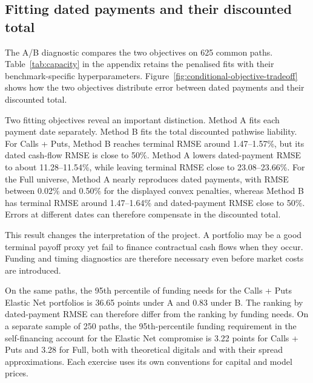 \subsection{Fitting dated payments and their discounted total}

The A/B diagnostic compares the two objectives on 625 common paths. Table~\ref{tab:capacity} in the appendix retains the penalised fits with their benchmark-specific hyperparameters. Figure~\ref{fig:conditional-objective-tradeoff} shows how the two objectives distribute error between dated payments and their discounted total.

Two fitting objectives reveal an important distinction. Method A fits each payment date separately. Method B fits the total discounted pathwise liability. For Calls + Puts, Method B reaches terminal RMSE around 1.47--1.57\%, but its dated cash-flow RMSE is close to 50\%. Method A lowers dated-payment RMSE to about 11.28--11.54\%, while leaving terminal RMSE close to 23.08--23.66\%. For the Full universe, Method A nearly reproduces dated payments, with RMSE between 0.02\% and 0.50\% for the displayed convex penalties, whereas Method B has terminal RMSE around 1.47--1.64\% and dated-payment RMSE close to 50\%. Errors at different dates can therefore compensate in the discounted total.


This result changes the interpretation of the project. A portfolio may be a good terminal payoff proxy yet fail to finance contractual cash flows when they occur. Funding and timing diagnostics are therefore necessary even before market costs are introduced.

On the same paths, the 95th percentile of funding needs for the Calls + Puts Elastic Net portfolios is 36.65 points under A and 0.83 under B. The ranking by dated-payment RMSE can therefore differ from the ranking by funding needs. On a separate sample of 250 paths, the 95th-percentile funding requirement in the self-financing account for the Elastic Net compromise is 3.22 points for Calls + Puts and 3.28 for Full, both with theoretical digitals and with their spread approximations. Each exercise uses its own conventions for capital and model prices.

